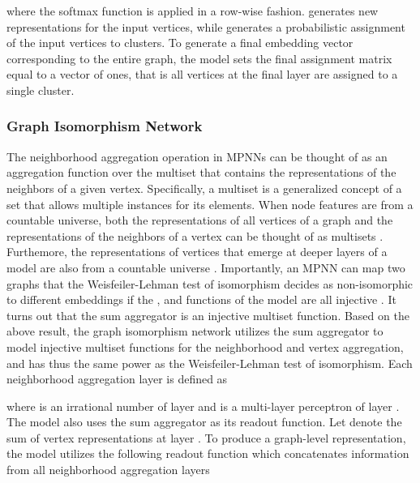 \documentclass[twoside,11pt]{article}
\begin{document}
where the softmax function is applied in a row-wise fashion.
 generates new representations for the input vertices, while  generates a probabilistic assignment of the input vertices to  clusters.
To generate a final embedding vector corresponding to the entire graph, the model sets the final assignment matrix equal to a vector of ones, that is all vertices at the final layer  are assigned to a single cluster. 

\subsubsection{Graph Isomorphism Network}
The neighborhood aggregation operation in MPNNs can be thought of as an aggregation function over the multiset that contains the representations of the neighbors of a given vertex. 
Specifically, a multiset is a generalized concept of a set that allows multiple instances for its elements.
When node features are from a countable universe, both the representations of all vertices of a graph and the representations of the neighbors of a vertex can be thought of as multisets .
Furthemore, the representations of vertices that emerge at deeper layers of a model are also from a countable universe .
Importantly, an MPNN can map two graphs that the Weisfeiler-Lehman test of isomorphism decides as non-isomorphic to different embeddings if the ,  and  functions of the model are all injective .
It turns out that the sum aggregator is an injective multiset function.
Based on the above result, the graph isomorphism network utilizes the sum aggregator to model injective multiset functions for the neighborhood and vertex aggregation, and has thus the same power as the Weisfeiler-Lehman test of isomorphism.
Each neighborhood aggregation layer is defined as

where  is an irrational number of layer  and  is a multi-layer perceptron of layer .
The model also uses the sum aggregator as its readout function.
Let  denote the sum of vertex representations at layer .
To produce a graph-level representation, the model utilizes the following readout function which concatenates information from all neighborhood aggregation layers
\end{document}
